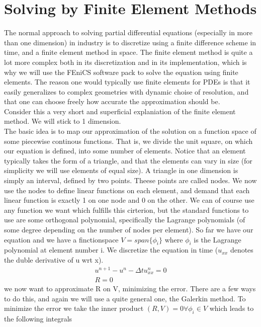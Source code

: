 \documentclass[a4paper,english, 10pt, twoside]{article}
\begin{document}
\section{Solving by Finite Element Methods}
The normal approach to solving partial differential equations (especially in more than one dimension) in industry is to discretize using a finite 
difference 
scheme in time, and a finite element method in space. The finite element method is quite a lot more complex both in its discretization and in its 
implementation, which is why we will use the FEniCS software pack to solve the equation using finite elements. The reason one would typically use 
finite elements for PDEs is that it easily generalizes to complex geometries with dynamic choise of resolution, and that one can choose freely how 
accurate the approximation should be.\\
Consider this a very short and superficial explaniation of the finite element method. We will stick to 1 dimension.\\
The basic idea is to map our approximation of the solution on a function space of some piecewise continous functions. That is, we divide the unit 
square, on which our equation is defined, into some number of elements. Notice that an element typically takes the form of a triangle, and that the 
elements can vary in size (for simplicity we will use elements of equal size). A triangle in one dimension is simply an interval, defined by two 
points. Theese points are called nodes. We now use the nodes to define linear functions on each element, and demand that each linear function is exactly 
1 on one node and 0 on the other. We can of course use any function we want which fulfills this cirterion, but the standard functions to use are 
some orthogonal polynomial, specifically the Lagrange polynomials (of some degree depending on the number of nodes per element). So far we have our 
equation and we have a finctionspace $V = span\{\phi_i\}$ where $\phi_i$ is the Lagrange polynomial at element number i. We discretize the equation 
in time ($u_{xx}$ denotes the duble derivative of u wrt x).
\begin{align*}
 u^{n+1}-u^n -\Delta tu^n_{xx} = 0 \\
 R = 0
\end{align*}
we now want to approximate R on V, minimizing the error. There are a few ways to do this, and again we will use a quite general one, the Galerkin 
method. To minimize the error we take the inner product $(R,V) = 0 \forall \phi_i \in V$ which leads to the following integrals
\end{document}

